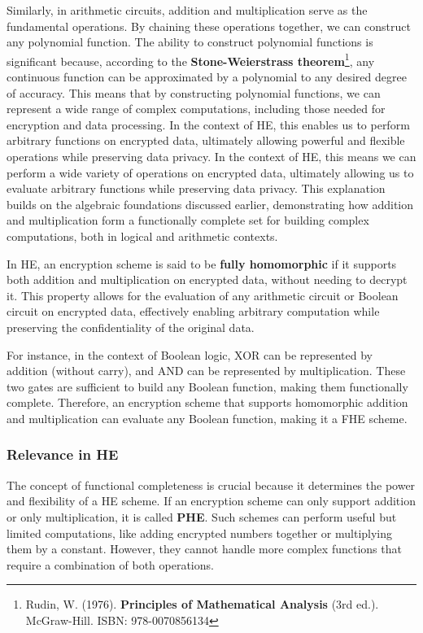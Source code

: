 \documentclass[
  letterpaper,
  DIV=11,
  numbers=noendperiod,
  oneside]{scrartcl}
\begin{document}
Similarly, in arithmetic circuits, addition and multiplication serve as
the fundamental operations. By chaining these operations together, we
can construct any polynomial function. The ability to construct
polynomial functions is significant because, according to the
\textbf{Stone-Weierstrass theorem}\footnote{Rudin, W. (1976).
  \textbf{Principles of Mathematical Analysis} (3rd ed.). McGraw-Hill.
  ISBN: 978-0070856134}, any continuous function can be approximated by
a polynomial to any desired degree of accuracy. This means that by
constructing polynomial functions, we can represent a wide range of
complex computations, including those needed for encryption and data
processing. In the context of HE, this enables us to perform arbitrary
functions on encrypted data, ultimately allowing powerful and flexible
operations while preserving data privacy. In the context of HE, this
means we can perform a wide variety of operations on encrypted data,
ultimately allowing us to evaluate arbitrary functions while preserving
data privacy. This explanation builds on the algebraic foundations
discussed earlier, demonstrating how addition and multiplication form a
functionally complete set for building complex computations, both in
logical and arithmetic contexts.

In HE, an encryption scheme is said to be \textbf{fully homomorphic} if
it supports both addition and multiplication on encrypted data, without
needing to decrypt it. This property allows for the evaluation of any
arithmetic circuit or Boolean circuit on encrypted data, effectively
enabling arbitrary computation while preserving the confidentiality of
the original data.

For instance, in the context of Boolean logic, XOR can be represented by
addition (without carry), and AND can be represented by multiplication.
These two gates are sufficient to build any Boolean function, making
them functionally complete. Therefore, an encryption scheme that
supports homomorphic addition and multiplication can evaluate any
Boolean function, making it a FHE scheme.

\subsubsection{Relevance in HE}\label{relevance-in-he}

The concept of functional completeness is crucial because it determines
the power and flexibility of a HE scheme. If an encryption scheme can
only support addition or only multiplication, it is called \textbf{PHE}.
Such schemes can perform useful but limited computations, like adding
encrypted numbers together or multiplying them by a constant. However,
they cannot handle more complex functions that require a combination of
both operations.
\end{document}
